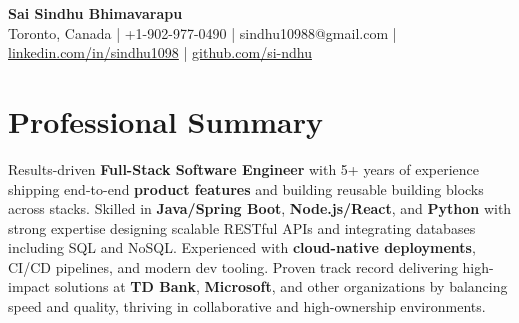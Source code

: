 \documentclass[letterpaper,11pt]{article}
\begin{document}
\begin{center}
  {\Large \textbf{Sai Sindhu Bhimavarapu}} \\
  Toronto, Canada \enspace | \enspace +1-902-977-0490 \enspace | \enspace sindhu10988@gmail.com \enspace | \enspace \href{https://www.linkedin.com/in/sindhu1098/}{linkedin.com/in/sindhu1098} \enspace | \enspace \href{https://github.com/si-ndhu}{github.com/si-ndhu}
\end{center}

\section{Professional Summary}
  \begin{itemize}[leftmargin=0.15in, label={}]
    \small{\item{
     Results-driven \textbf{Full-Stack Software Engineer} with 5+ years of experience shipping end-to-end \textbf{product features} and building reusable building blocks across stacks. Skilled in \textbf{Java/Spring Boot}, \textbf{Node.js/React}, and \textbf{Python} with strong expertise designing scalable RESTful APIs and integrating databases including SQL and NoSQL. Experienced with \textbf{cloud-native deployments}, CI/CD pipelines, and modern dev tooling. Proven track record delivering high-impact solutions at \textbf{TD Bank}, \textbf{Microsoft}, and other organizations by balancing speed and quality, thriving in collaborative and high-ownership environments.
    }}
  \end{itemize}
\vspace{-16pt}

\end{document}
